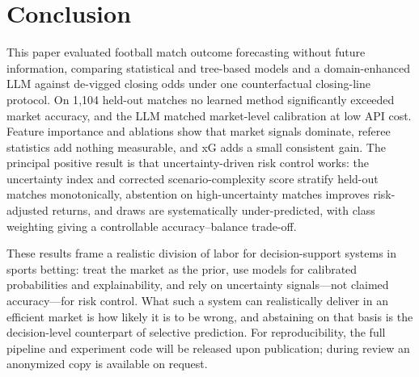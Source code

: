 \documentclass[10pt]{article}
\begin{document}
\section{Conclusion}
\label{sec:conclusion}
This paper evaluated football match outcome forecasting without future
information, comparing statistical and tree-based models and a domain-enhanced
LLM against de-vigged closing odds under one counterfactual closing-line
protocol. On 1{,}104 held-out matches no learned method
significantly exceeded market accuracy, and the LLM matched market-level
calibration at low API cost. Feature importance and ablations show that market
signals dominate, referee statistics add nothing measurable, and xG adds a
small consistent gain. The principal positive result is that uncertainty-driven
risk control works: the uncertainty index and corrected scenario-complexity
score stratify held-out matches monotonically, abstention on high-uncertainty
matches improves risk-adjusted returns, and draws are systematically
under-predicted, with class weighting giving a controllable
accuracy--balance trade-off.

These results frame a realistic division of labor for decision-support systems
in sports betting: treat the market as the prior, use models for calibrated
probabilities and explainability, and rely on uncertainty signals---not claimed
accuracy---for risk control. What such a system can realistically deliver in an
efficient market is how likely it is to be wrong, and abstaining on that basis is
the decision-level counterpart of selective prediction. For reproducibility, the
full pipeline and experiment code will be released upon publication; during review
an anonymized copy is available on request.
\end{document}
